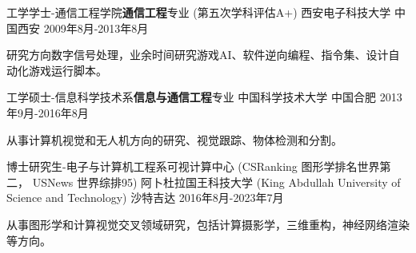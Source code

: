 

\begin{cventries}
	
  \cventry
    {工学学士-通信工程学院\textbf{通信工程}专业 (第五次学科评估A+)} %
    {西安电子科技大学} %
    {中国西安} %
    {2009年8月-2013年8月} %
    {
      \begin{cvitems} %
        \item {研究方向数字信号处理，业余时间研究游戏AI、软件逆向编程、指令集、设计自动化游戏运行脚本。}
      \end{cvitems}
    }

	\cventry
	{工学硕士-信息科学技术系\textbf{信息与通信工程}专业} %
	{中国科学技术大学} %
	{中国合肥} %
	{2013年9月-2016年8月} %
	{
		\begin{cvitems} %
			\item {从事计算机视觉和无人机方向的研究、视觉跟踪、物体检测和分割。}
		\end{cvitems}
	}

	\cventry
	{博士研究生-电子与计算机工程系可视计算中心 (CSRanking 图形学排名世界第二， USNews 世界综排95)} %
	{阿卜杜拉国王科技大学 (King Abdullah University of Science and Technology)} %
	{沙特吉达} %
	{2016年8月-2023年7月} %
	{
		\begin{cvitems} %
			\item {从事图形学和计算视觉交叉领域研究，包括计算摄影学，三维重构，神经网络渲染等方向。}
		\end{cvitems}
	}


\end{cventries}
